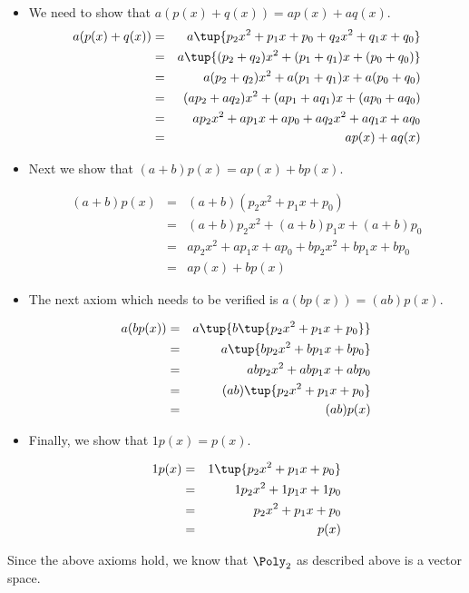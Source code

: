 \begin{solution}
\begin{itemize}
\item
We need to show that $a(p(x) + q(x)) = ap(x) + aq(x)$. 
\begin{eqnarray*}
a(p(x) + q(x)) &=& a \tup{p_2x^2 + p_1x + p_0 + q_2x^2 + q_1x + q_0 }\\
&=& a \tup{(p_2+q_2)x^2 + (p_1+q_1)x + (p_0+q_0)  }\\
&=&  a(p_2+q_2)x^2  + a(p_1+q_1)x +  a(p_0 + q_0) \\
&=& (ap_2 + aq_2)x^2 + (ap_1+aq_1)x + (ap_0 + aq_0)  \\
&=&  ap_2x^2 + ap_1x + ap_0 + aq_2x^2 +aq_1x + aq_0\\
&=& ap(x) + aq(x) 
\end{eqnarray*}

\item
Next we show that $(a+b) p(x) = ap(x) + bp(x)$. 

\begin{eqnarray*} 
(a+b) p(x) &=& (a+b) ( p_2x^2 + p_1x + p_0)\\
&=& (a+b)p_2x^2 + (a+b)p_1x + (a+b)p_0   \\
&=&  ap_2x^2 + ap_1x + ap_0 + bp_2x^2 +bp_1x + bp_0\\
&=& ap(x) + bp(x)
\end{eqnarray*}

\item
The next axiom which needs to be verified is $a(bp(x)) = (ab)p(x)$. 

\begin{eqnarray*}
a(bp(x)) &=& a \tup{b \tup{p_2x^2 + p_1x +p_0}} \\
&=& a \tup{bp_2x^2 +bp_1x + bp_0 }\\
&=&  abp_2x^2 + abp_1x + abp_0 \\
&=& (ab) \tup{p_2x^2 +p_1x + p_0 }\\
&=& (ab) p(x) 
\end{eqnarray*}

\item 
Finally, we show that $1p(x) = p(x)$. 

\begin{eqnarray*}
1p(x) &=& 1 \tup{p_2x^2  + p_1x +  p_0}\\
&=&  1p_2x^2 + 1p_1x + 1p_0\\
&=&  p_2x^2 + p_1x + p_0\\
&=& p(x)
\end{eqnarray*}

\end{itemize}

Since the above axioms hold, we know that $\Poly_2$ as described above is a vector space. 
\end{solution}

